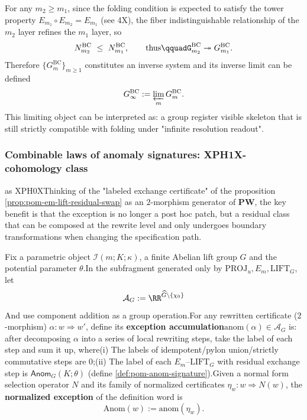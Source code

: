 

\begin{corollary}\label{cor:pom-bc-inverse-system}For any \(m_2\ge m_1\), since the folding condition is expected to satisfy the tower property \(E_{m_1}\circ E_{m_2}=E_{m_1}\) (see \SXPH4X), the fiber indistinguishable relationship of the \(m_2\) layer refines the \(m_1\) layer, so\[
N^{\mathrm{BC}}_{m_2}\ \le\ N^{\mathrm{BC}}_{m_1},
\qquad\text{thus}\qquadG^{\mathrm{BC}}_{m_2}\twoheadrightarrow G^{\mathrm{BC}}_{m_1}.
\]
Therefore \(\{G^{\mathrm{BC}}_m\}_{m\ge 1}\) constitutes an inverse system and its inverse limit can be defined\[
G^{\mathrm{BC}}_\infty:=\varprojlim_m G^{\mathrm{BC}}_m.
\]
This limiting object can be interpreted as: a group register visible skeleton that is still strictly compatible with folding under "infinite resolution readout".\end{corollary}

\subsubsection{Combinable laws of anomaly signatures: \texorpdfstring{XPH1X}{2}-cohomology class}\label{subsec:pom-anom-cohomology} as \texorpdfstring{XPH0X}{PW}Thinking of the "labeled exchange certificate" of the proposition \ref{prop:pom-em-lift-residual-swap} as an \(2\)-morphism generator of \(\mathbf{PW}\), the key benefit is that the exception is no longer a post hoc patch, but a residual class that can be composed at the rewrite level and only undergoes boundary transformations when changing the specification path.
\begin{definition}\label{def:pom-anom-accumulation}Fix a parametric object \(\mathcal{I}(m;K;\kappa)\), a finite Abelian lift group \(G\) and the potential parameter \(\theta\).In the subfragment generated only by \(\mathrm{PROJ}_u,E_m,\mathrm{LIFT}_G\), let\[
\mathcal{A}_G:=\RR^{\widehat G\setminus\{\chi_0\}}
\]
And use component addition as a group operation.For any rewritten certificate (\(2\)-morphism) \(\alpha:w\Rightarrow w'\), define its \textbf{exception accumulation}\(\mathrm{anom}(\alpha)\in\mathcal{A}_G\)
is: after decomposing \(\alpha\) into a series of local rewriting steps, take the label of each step and sum it up, where(i) The labels of idempotent/pylon union/strictly commutative steps are \(0\);(ii) The label of each \(E_m\)--\(\mathrm{LIFT}_G\) with residual exchange step is \(\mathsf{Anom}_G(K;\theta)\) (define \ref{def:pom-anom-signature}).Given a normal form selection operator \(N\) and its family of normalized certificates \(\eta_w:w\Rightarrow N(w)\), the \textbf {normalized exception} of the definition word is\[
\mathrm{Anom}(w):=\mathrm{anom}(\eta_w).
\]
\end{definition}

